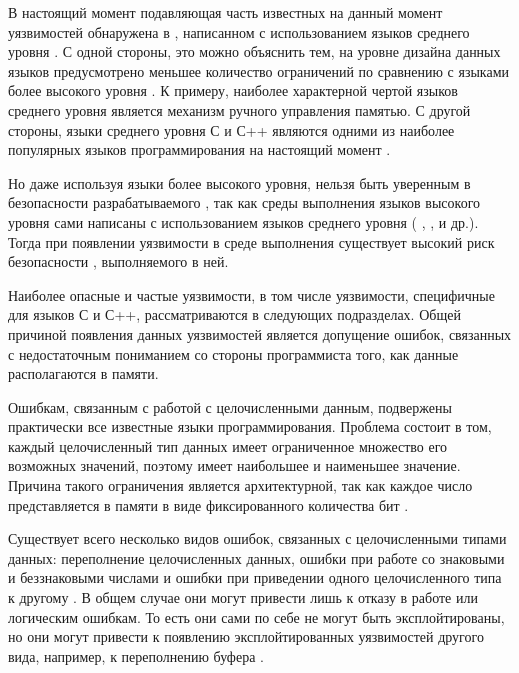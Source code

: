 %
В настоящий момент подавляющая часть известных на данный момент уязвимостей обнаружена в 
, написанном с использованием языков среднего уровня  
 . 
%
С одной стороны, это можно объяснить тем, на уровне дизайна данных языков предусмотрено меньшее 
количество ограничений по сравнению с языками более высокого уровня . 
%
К примеру, наиболее характерной чертой языков среднего уровня является механизм ручного управления 
памятью. 
%
С другой стороны, языки среднего уровня С  и С++ 
 являются одними из наиболее популярных языков программирования 
на настоящий момент .

%
Но даже используя языки более высокого уровня, нельзя быть уверенным в безопасности 
разрабатываемого , так как среды выполнения языков высокого уровня сами 
написаны с использованием 
языков среднего уровня ( ,  , 
  и др.). 
%
Тогда при появлении уязвимости в среде выполнения существует высокий риск безопасности 
, выполняемого в ней.

%
Наиболее опасные и частые уязвимости, в том числе уязвимости, специфичные для языков С и С++, 
рассматриваются в следующих подразделах. 
%
Общей причиной появления данных уязвимостей является допущение ошибок, связанных с недостаточным 
пониманием со стороны программиста того, как данные располагаются в памяти.


%
Ошибкам, связанным с работой с целочисленными данным, подвержены практически все известные языки 
программирования. 
%
Проблема состоит в том, каждый целочисленный тип данных имеет ограниченное множество его возможных 
значений, поэтому имеет наибольшее и наименьшее значение. 
%
Причина такого ограничения является архитектурной, так как каждое число представляется в памяти 
в виде фиксированного количества бит .

%
Существует всего несколько видов ошибок, связанных с целочисленными типами данных: переполнение 
целочисленных данных, ошибки при работе со знаковыми и беззнаковыми числами и ошибки при приведении 
одного целочисленного типа к другому   
 . 
%
В общем случае они могут привести лишь к отказу в работе или логическим ошибкам. 
%
То есть они сами по себе не могут быть эксплойтированы, но они могут привести к появлению 
эксплойтированных уязвимостей другого вида, например, к переполнению буфера . 

